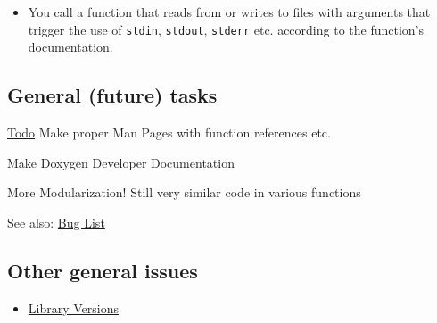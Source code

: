 \begin{itemize}
\item You call a function that reads from or writes to files with arguments that trigger the use of {\tt stdin}, {\tt stdout}, {\tt stderr} etc. according to the function's documentation.\end{itemize}
\hypertarget{properties_general_tasks}{}\subsection{General (future) tasks}\label{properties_general_tasks}
\begin{Desc}
\item[\hyperlink{todo__todo000002}{Todo}]Make proper Man Pages with function references etc. 

Make Doxygen Developer Documentation 

More Modularization! Still very similar code in various functions \end{Desc}
\begin{Desc}
\item[See also:]\hyperlink{bug}{Bug List}\end{Desc}
\hypertarget{properties_misc_general_issues}{}\subsection{Other general issues}\label{properties_misc_general_issues}
\begin{itemize}
\item \hyperlink{development_versions}{Library Versions} \end{itemize}
